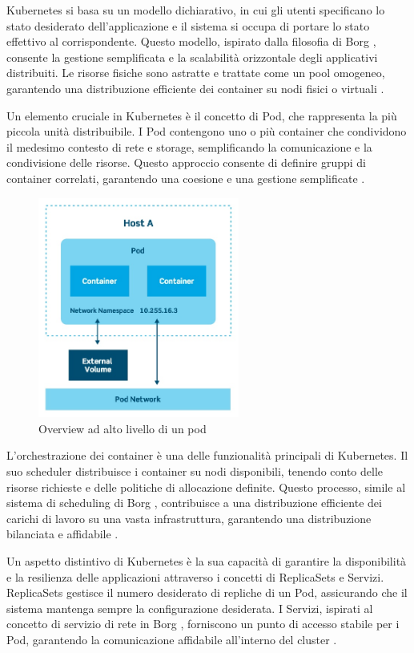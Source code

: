 Kubernetes si basa su un modello dichiarativo, in cui gli utenti specificano lo stato desiderato dell'applicazione e il sistema si occupa di portare lo stato effettivo al corrispondente. Questo modello, ispirato dalla filosofia di Borg \cite{verma2015large}, consente la gestione semplificata e la scalabilità orizzontale degli applicativi distribuiti. Le risorse fisiche sono astratte e trattate come un pool omogeneo, garantendo una distribuzione efficiente dei container su nodi fisici o virtuali \cite{burns2016borg}.

Un elemento cruciale in Kubernetes è il concetto di Pod, che rappresenta la più piccola unità distribuibile. I Pod contengono uno o più container che condividono il medesimo contesto di rete e storage, semplificando la comunicazione e la condivisione delle risorse. Questo approccio consente di definire gruppi di container correlati, garantendo una coesione e una gestione semplificate \cite{burns2016borg}.

\begin{figure}[h]
    \centering
    \includegraphics[width=250px]{figures/ch3/kube-pod.jpg}
    \caption[Overview ad alto livello di un pod]{Overview ad alto livello di un pod}
    \label{fig:cha3:k8s2}
\end{figure}

L'orchestrazione dei container è una delle funzionalità principali di Kubernetes. Il suo scheduler distribuisce i container su nodi disponibili, tenendo conto delle risorse richieste e delle politiche di allocazione definite. Questo processo, simile al sistema di scheduling di Borg \cite{burns2016borg}, contribuisce a una distribuzione efficiente dei carichi di lavoro su una vasta infrastruttura, garantendo una distribuzione bilanciata e affidabile \cite{burns2016borg}.

Un aspetto distintivo di Kubernetes è la sua capacità di garantire la disponibilità e la resilienza delle applicazioni attraverso i concetti di ReplicaSets e Servizi. ReplicaSets gestisce il numero desiderato di repliche di un Pod, assicurando che il sistema mantenga sempre la configurazione desiderata. I Servizi, ispirati al concetto di servizio di rete in Borg \cite{verma2015large}, forniscono un punto di accesso stabile per i Pod, garantendo la comunicazione affidabile all'interno del cluster \cite{burns2016borg}.

